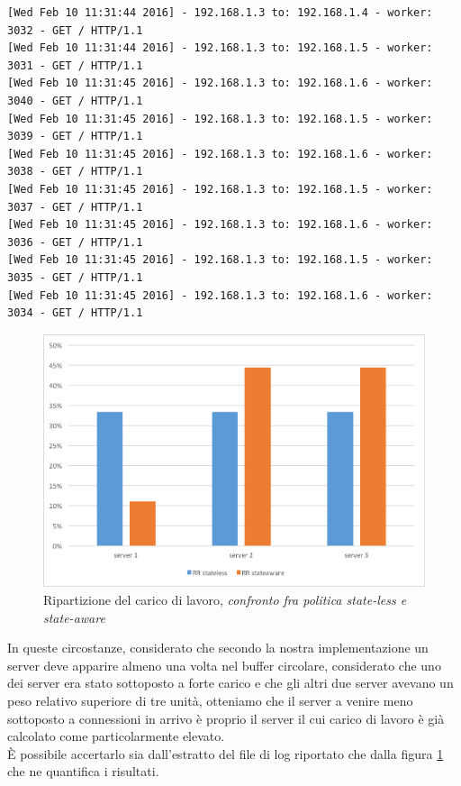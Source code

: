 \documentclass[italian]{tktltiki2}
\begin{document}
\begin{lstlisting}[basicstyle=\fontsize{6.4}{7}\selectfont\ttfamily]
[Wed Feb 10 11:31:44 2016] - 192.168.1.3 to: 192.168.1.4 - worker: 3032 - GET / HTTP/1.1
[Wed Feb 10 11:31:44 2016] - 192.168.1.3 to: 192.168.1.5 - worker: 3031 - GET / HTTP/1.1
[Wed Feb 10 11:31:45 2016] - 192.168.1.3 to: 192.168.1.6 - worker: 3040 - GET / HTTP/1.1
[Wed Feb 10 11:31:45 2016] - 192.168.1.3 to: 192.168.1.5 - worker: 3039 - GET / HTTP/1.1
[Wed Feb 10 11:31:45 2016] - 192.168.1.3 to: 192.168.1.6 - worker: 3038 - GET / HTTP/1.1
[Wed Feb 10 11:31:45 2016] - 192.168.1.3 to: 192.168.1.5 - worker: 3037 - GET / HTTP/1.1
[Wed Feb 10 11:31:45 2016] - 192.168.1.3 to: 192.168.1.6 - worker: 3036 - GET / HTTP/1.1
[Wed Feb 10 11:31:45 2016] - 192.168.1.3 to: 192.168.1.5 - worker: 3035 - GET / HTTP/1.1
[Wed Feb 10 11:31:45 2016] - 192.168.1.3 to: 192.168.1.6 - worker: 3034 - GET / HTTP/1.1
\end{lstlisting}
\begin{figure}[H]
\centering
\includegraphics[width=\textwidth]{images/round_robin_cfr}
\caption{Ripartizione del carico di lavoro, \emph{confronto fra politica state-less e state-aware}\label{fig: rrobin_cfr}}
\end{figure}
In queste circostanze, considerato che secondo la nostra implementazione un server deve apparire almeno una volta nel buffer circolare, considerato che uno dei server era stato sottoposto a forte carico e che gli altri due server avevano un peso relativo superiore di tre unità, otteniamo che il server a venire meno sottoposto a connessioni in arrivo è proprio il server il cui carico di lavoro è già calcolato come particolarmente elevato. \\
È possibile accertarlo sia dall'estratto del file di log riportato che dalla figura \ref{fig: rrobin_cfr} che ne quantifica i risultati.
\newpage
\end{document}

